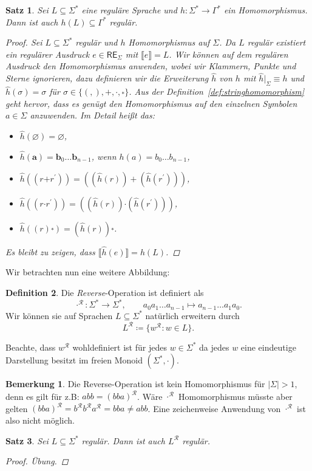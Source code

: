 \documentclass[11pt, a4paper]{article}
\theoremstyle{definition}
\newtheorem{definition}{Definition}[section]
\newtheorem*{remark*}{Bemerkung}
\theoremstyle{plain}
\newtheorem{theorem}[definition]{Satz}
\numberwithin{equation}{section}
\let\emptyset\varnothing
\begin{document}
\begin{theorem}
	Sei $L \subseteq \Sigma^\ast$ eine reguläre Sprache und $h\colon \Sigma^\ast \to \Gamma^\ast$ ein Homomorphismus. Dann ist auch $h(L) \subseteq \Gamma^\ast$ regulär.
	\begin{proof}
		Sei $L \subseteq \Sigma^\ast$ regulär und $h$ Homomorphismus auf $\Sigma$. Da $L$ regulär existiert ein regulärer Ausdruck $e \in \mathsf{RE}_\Sigma$ mit $\llbracket e \rrbracket = L$. Wir können auf dem regulären Ausdruck den Homomorphismus anwenden, wobei wir Klammern, Punkte und Sterne ignorieren, dazu definieren wir die Erweiterung $\hat{h}$ von $h$ mit $\hat{h} \vert_\Sigma \equiv h$ und $\hat{h}(\sigma) = \sigma$ für $\sigma \in \{(,),\bm{+}, \bm{\cdot}, \overset{\bm{\ast}}{}\}$. Aus der Definition~\ref{def:stringhomomorphism} geht hervor, dass es genügt den Homomorphismus auf den einzelnen Symbolen $a \in \Sigma$ anzuwenden. Im Detail heißt das: 
		\begin{itemize}
			\item $\hat{h}(\bm{\emptyset}) = \bm{\emptyset}$,
			\item $\hat{h}(\bm{a}) = \bm{b}_0 \ldots \bm{b}_{n-1}$, wenn $h(a) = b_0 \ldots b_{n-1}$,
			\item $\hat{h}((r \bm{+} r^\prime)) = ((\hat{h}(r)) + (\hat{h}(r^\prime)))$,
			\item $\hat{h}((r \bm{\cdot} r^\prime)) = ((\hat{h}(r)) \bm{\cdot} (\hat{h}(r^\prime)))$,
			\item $\hat{h}((r)\overset{\bm{\ast}}{}) = (\hat{h}(r))\overset{\bm{\ast}}{}$.
		\end{itemize} 
		Es bleibt zu zeigen, dass $\llbracket \hat{h}(e) \rrbracket = h(L)$.
	\end{proof}
\end{theorem}
Wir betrachten nun eine weitere Abbildung:
\begin{definition}
	Die \textit{Reverse}-Operation ist definiert als
	$$
		\cdot^\mathcal{R} \colon \Sigma^\ast \to \Sigma^\ast, \quad\quad a_0 a_1 \ldots a_{n-1} \mapsto a_{n-1} \ldots a_1 a_0.
	$$
	Wir können sie auf Sprachen $L \subseteq \Sigma^\ast$ natürlich erweitern durch
	$$
		L^\mathcal{R} \coloneqq \{ w^\mathcal{R} : w \in L \}.
	$$
\end{definition}
Beachte, dass $w^\mathcal{R}$ wohldefiniert ist für jedes $w \in \Sigma
^\ast$ da jedes $w$ eine eindeutige Darstellung besitzt im freien Monoid $(\Sigma^\ast, \cdot)$.
\begin{remark*}
	Die Reverse-Operation ist kein Homomorphismus für $|\Sigma| > 1$, denn es gilt für z.B: $abb = (bba)^\mathcal{R}$. Wäre $\cdot^\mathcal{R}$ Homomorphismus müsste aber gelten $(bba)^\mathcal{R} = b^\mathcal{R} b^\mathcal{R} a^\mathcal{R} = bba \neq abb$. Eine zeichenweise Anwendung von $\cdot^\mathcal{R}$ ist also nicht möglich.
\end{remark*}
\begin{theorem}
	Sei $L \subseteq \Sigma^\ast$ regulär. Dann ist auch $L^\mathcal{R}$ regulär.
	\begin{proof}
		Übung.
	\end{proof}
\end{theorem}
\end{document}

